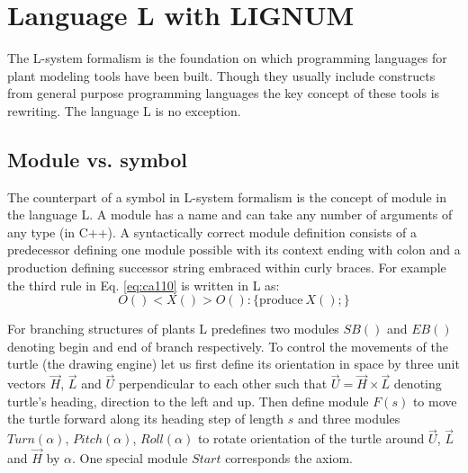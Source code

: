 \section{Language L with LIGNUM}

The  L-system  formalism  is   the  foundation  on  which  programming
languages  for  plant modeling  tools  have  been  built. Though  they
usually include constructs  from general purpose programming languages
the key  concept of  these tools  is rewriting. The  language L  is no
exception.

\subsection{Module vs. symbol}
The counterpart  of a symbol in  L-system formalism is  the concept of
module in the language L. A module  has a name and can take any number
of arguments  of any  type (in C++).   A syntactically  correct module
definition consists of a predecessor defining one module possible with
its  context ending  with colon  and a  production  defining successor
string embraced  within curly braces.   For example the third  rule in
Eq. \ref{eq:ca110} is written in L as:
\begin{equation}
 O() < X() > O(): \{\mathrm{produce}\ X();\}
\end{equation}

For branching structures of plants L predefines two modules $SB()$ and
$EB()$ denoting begin and end  of branch respectively.  To control the
movements of the  turtle (the drawing engine) let  us first define its
orientation  in space by  three unit  vectors $\vec  H$, $\vec  L$ and
$\vec U$ perpendicular to each other such that $\vec U = \vec H \times
\vec L$ denoting turtle's heading,  direction to the left and up. Then
define module $F(s)$ to move the turtle forward along its heading step
of  length  $s$  and  three modules  $Turn(\alpha)$,  $Pitch(\alpha)$,
$Roll(\alpha)$ to  rotate orientation of  the turtle around  $\vec U$,
$\vec  L$  and $\vec  H$  by  $\alpha$.   One special  module  $Start$
corresponds the axiom.

